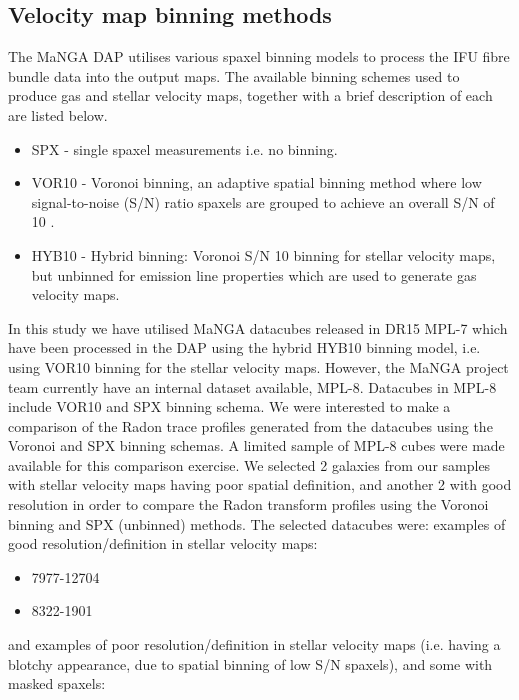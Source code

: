 \subsection{Velocity map binning methods}
The MaNGA DAP utilises various spaxel binning models to process the IFU fibre bundle data into the output maps. The available binning schemes used to produce gas and stellar velocity maps, together with a brief description of each are listed below.

\begin{itemize}
    \item SPX - single spaxel measurements i.e. no binning.
    \item VOR10 - Voronoi binning, an adaptive spatial binning method where low signal-to-noise (S/N) ratio spaxels are grouped to achieve an overall S/N of 10  \citep{2003MNRAS.342..345C, 2019arXiv190100856W}.
    \item HYB10 - Hybrid binning: Voronoi S/N 10 binning for stellar velocity maps, but unbinned for emission line properties which are used to generate gas velocity maps.
\end{itemize}  

In this study we have utilised MaNGA datacubes released in DR15 MPL-7 which have been processed in the DAP using the hybrid HYB10 binning model, i.e. using VOR10 binning for the stellar velocity maps. However, the MaNGA project team currently have an internal dataset available, MPL-8. Datacubes in MPL-8 include VOR10 and SPX binning schema. We were interested to make a comparison of the Radon trace profiles generated from the datacubes using the Voronoi and SPX binning schemas. A limited sample of MPL-8 cubes were made available for this comparison exercise. We selected 2 galaxies from our samples with stellar velocity maps having poor spatial definition, and another 2 with good resolution in order to compare the Radon transform profiles using the Voronoi binning and SPX (unbinned) methods. The selected datacubes were: examples of good resolution/definition in stellar velocity maps:

\begin{itemize}
    \item 7977-12704
    \item 8322-1901
\end{itemize}

and examples of poor resolution/definition in stellar velocity maps (i.e. having a blotchy appearance, due to spatial binning of low S/N spaxels), and some with masked spaxels:

